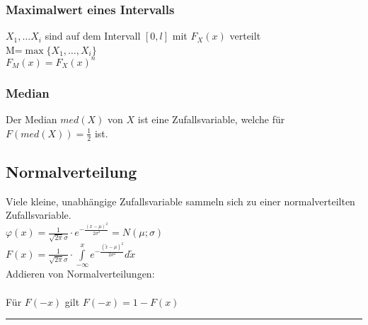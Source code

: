 \begin{multicols}{2}    
  \subsubsection{Maximalwert eines Intervalls}
    $X_1,\ldots X_i$ sind auf dem Intervall $[0,l]$ mit $F_X(x)$ verteilt\\
    M=$\max \{ X_1,\ldots,X_i\} $ \\
    $F_M(x)=F_X(x)^n$ \\
	\columnbreak
  \subsubsection{Median \skript{\pageref{sk-subsubsection-median}}}
    Der Median $med(X)$ von $X$ ist eine Zufallsvariable, welche für
    $F(med(X)) = \frac{1}{2}$ ist.
  
\end{multicols}


\subsection{Normalverteilung}
\begin{minipage}{12cm}
	Viele kleine, unabhängige Zufallsvariable sammeln sich zu einer
	normalverteilten Zufallsvariable.\\
	$\varphi(x)=\frac{1}{\sqrt{2
			\pi}\sigma}\cdot e^{-\frac{(x-\mu)^2}{2\sigma^2}} = N(\mu ; \sigma) $\\ 
	$F(x)=\frac{1}{\sqrt{2\pi}\sigma}\cdot \int\limits^{x}_{-\infty}{e^{-\frac{(\tilde{x} -\mu)^2}{2\sigma^2}}} d\tilde{x} $ \\
	Addieren von Normalverteilungen: \\
	 \\
	Für $F(-x)$ gilt $F(-x) = 1 - F(x)$
\end{minipage}
\begin{minipage}{6cm}
	
\end{minipage}
\hrule

